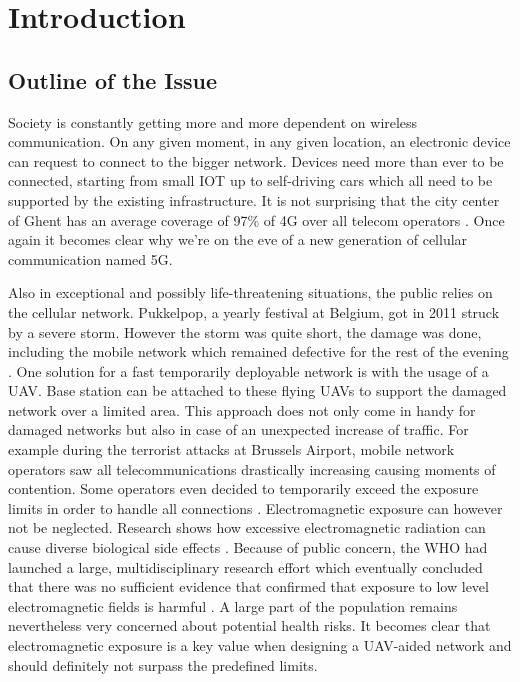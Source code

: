 \chapter{Introduction}
\label{chap:intro}

\section{Outline of the Issue} %
\label{sec:issue}

Society is constantly getting more and more dependent on wireless communication. 
On any given moment, in any given location, an electronic device
can request to connect to the bigger network. Devices need more than ever to be connected, 
starting from small \gls{IOT} up to self-driving cars
which all need to be supported by the existing infrastructure. 
It is not surprising that the city center of Ghent has an average coverage of 97\% of 4G over all telecom operators
\cite{testaankoop}. Once again it becomes clear why we're on the eve of a new generation of cellular communication named 5G. 

Also in exceptional and possibly life-threatening situations, the public relies on the cellular network. 
Pukkelpop, a yearly festival at Belgium, got in 2011 struck by a severe storm. However the  storm 
was quite short, the damage was done, including the mobile network which remained defective for the rest of the evening \cite{pukkelpop}.
One solution for a fast temporarily deployable network is with the usage of a \gls{UAV}. Base station can be attached to 
these flying \gls{UAV}s to support the damaged network over a limited area. 
This approach does not only come in handy for 
damaged networks but also in case of an unexpected increase of traffic. 
For example during the terrorist attacks at Brussels Airport,
mobile network operators saw all telecommunications drastically increasing causing moments of contention. 
Some operators even decided to temporarily exceed the exposure limits in
order to handle all connections \cite{baseZaventem}.
Electromagnetic exposure can however not be neglected. Research shows how excessive electromagnetic radiation can cause diverse biological side effects \cite{bioeffects}.
Because of public concern, the \gls{WHO} had launched a large, multidisciplinary research effort which eventually concluded that there was no sufficient evidence that confirmed 
that exposure to low level electromagnetic fields is harmful \cite{WHO}. 
A large part of the population remains nevertheless very concerned about potential health risks.
It becomes clear that electromagnetic exposure is a key value  when designing a \gls{UAV}-aided network and should definitely 
not surpass the predefined limits.


